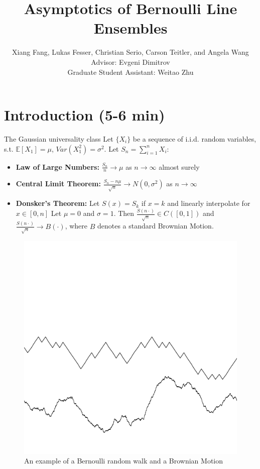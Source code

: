 \documentclass[9pt,t,dvipsnames]{beamer}
\title{Asymptotics of Bernoulli Line Ensembles}
\author[Fang, Fesser, Serio, Teitler, and Wang]{Xiang Fang, Lukas Fesser, Christian Serio, Carson Teitler, and Angela Wang \\
Advisor: Evgeni Dimitrov\\
Graduate Student Assistant: Weitao Zhu}
\institute[Columbia]{Columbia University REU}
\begin{document}
	
	\begin{frame}
		\maketitle
	\end{frame}


\section{Introduction (5-6 min)}

\begin{frame}{The Gaussian universality class}
Let $\{X_i\}$ be a sequence of i.i.d. random variables, s.t. $\mathbb{E}[X_1] = \mu$, $Var(X_1^2) = \sigma^2$. Let $S_n = \sum_{i = 1}^n X_i$:

\bigskip

\begin{itemize}
\item \textbf{Law of Large Numbers:} $\frac{S_n}{n} \rightarrow \mu$ as $n \rightarrow \infty$ almost surely

\bigskip

\item \textbf{Central Limit Theorem:} $\frac{S_n - n \mu}{\sqrt{n}} \rightarrow N(0, \sigma^2)$ as $n \rightarrow \infty$

\bigskip

\item \textbf{Donsker's Theorem:} Let $S(x) = S_k$ if $x = k$ and linearly interpolate for $x \in [0, n]$ Let $\mu = 0$ and $\sigma = 1$. Then $\frac{S(n\cdot)}{\sqrt{n}} \in C([0, 1])$ and $\frac{S(n\cdot)}{\sqrt{n}} \rightarrow B(\cdot)$, where $B$ denotes a standard Brownian Motion.
\end{itemize}
\begin{figure}
\includegraphics[height=0.3\textheight]{graphics/Gaussian.png}
\caption{An example of a Bernoulli random walk and a Brownian Motion}
\end{figure}

\end{frame}
\end{document}
